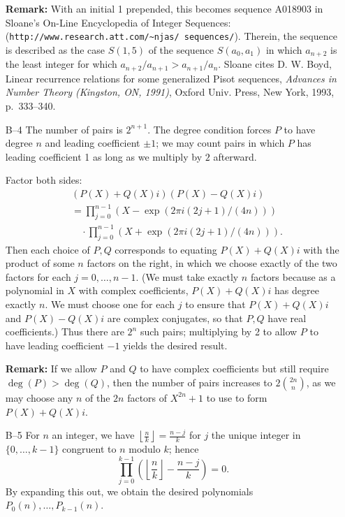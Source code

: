 \documentclass[amssymb,twocolumn,pra,10pt,aps]{revtex4-1}
\begin{document}
\begin{itemize}
\textbf{Remark:}
With an initial 1 prepended,
this becomes
sequence A018903 in Sloane's On-Line Encyclopedia of Integer Sequences:
(\texttt{http://www.research.att.com/\~{}njas/ sequences/}).
Therein, the sequence is described as the case $S(1,5)$ of the sequence
$S(a_0, a_1)$ in which $a_{n+2}$ is the least integer for which
$a_{n+2}/a_{n+1}>a_{n+1}/a_n$. Sloane cites
 D. W. Boyd, Linear recurrence relations for some generalized Pisot sequences,
\textit{Advances in Number Theory (Kingston, ON, 1991)}, Oxford Univ.
Press, New York, 1993, p.\ 333--340.

\item[B--4]
The number of pairs is $2^{n+1}$. The degree condition forces
$P$ to have degree $n$ and leading coefficient $\pm 1$; we may count
pairs in which $P$ has leading coefficient 1 as long as we multiply by $2$
afterward.

Factor both sides:
\begin{align*}
& (P(X) + Q(X)i)(P(X) - Q(X)i) \\
& = \prod_{j=0}^{n-1}
(X - \exp(2 \pi i (2j+1)/(4n))) \\
& \quad \cdot \prod_{j=0}^{n-1}
(X + \exp(2 \pi i (2j+1)/(4n))).
\end{align*}
Then each choice of $P,Q$ corresponds to equating $P(X) + Q(X)i$
with the product of some $n$ factors on the right,
in which we choose exactly of the two factors for each $j=0,\dots,n-1$.
(We must take exactly $n$
factors because as a polynomial in $X$ with complex coefficients, $P(X) + Q(X)i$
has degree exactly $n$. We must choose one for each $j$ to ensure that
$P(X) + Q(X)i$ and $P(X) -Q(X)i$ are complex conjugates, so that $P, Q$ have
real coefficients.) Thus there are $2^n$ such pairs;
multiplying by 2 to allow $P$ to have
leading coefficient $-1$ yields the desired result.

\textbf{Remark:} If we allow $P$ and $Q$ to have complex coefficients but
still require $\deg(P) > \deg(Q)$, then the number of pairs increases
to $2\binom{2n}{n}$, as we may choose any $n$ of the $2n$ factors of
$X^{2n}+1$ to use to form $P(X) + Q(X)i$.

\item[B--5]
  For $n$ an integer, we have
$\left\lfloor \frac{n}{k} \right\rfloor = \frac{n-j}{k}$ for $j$
the unique integer in $\{0,\dots,k-1\}$ congruent to $n$ modulo $k$;
hence
\[
\prod_{j=0}^{k-1} \left( \left\lfloor \frac{n}{k} \right\rfloor - \frac{n-j}{k}
\right) = 0.
\]
By expanding this out, we obtain
the desired polynomials $P_0(n), \dots, P_{k-1}(n)$.


\end{itemize}
\end{document}
